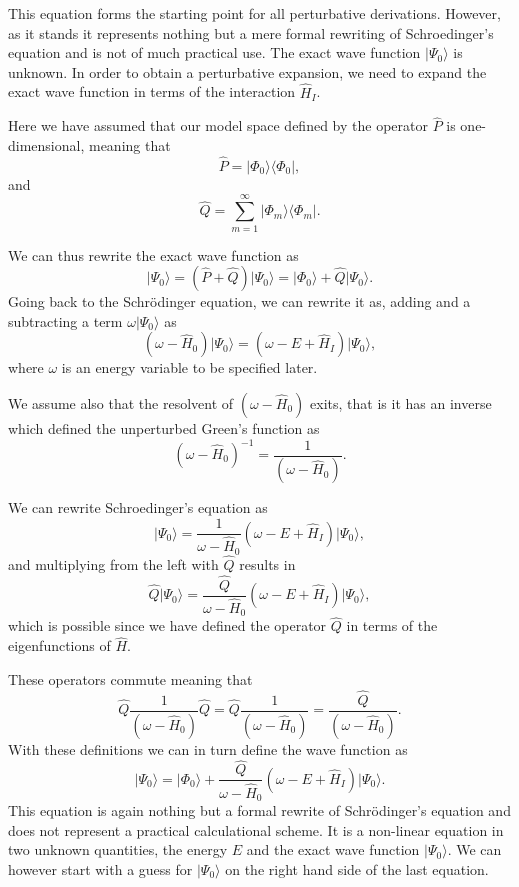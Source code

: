 \documentclass[graybox,sectrefs,envcountresetchap,open=right]{svmonodo}
\begin{document}
This equation forms the starting point for all perturbative derivations. However,
as it stands it represents nothing but a mere formal rewriting of Schroedinger's equation and is not of much practical use. The exact wave function $\vert \Psi_0\rangle$ is unknown. In order to obtain a perturbative expansion, we need to expand the exact wave function in terms of the interaction $\hat{H}_I$. 

Here we have assumed that our model space defined by the operator $\hat{P}$ is one-dimensional, meaning that
\[
\hat{P}= \vert \Phi_0\rangle \langle \Phi_0\vert ,
\]
and
\[
\hat{Q}=\sum_{m=1}^{\infty}\vert \Phi_m\rangle \langle \Phi_m\vert .
\]


We can thus rewrite the exact wave function as
\[
\vert \Psi_0\rangle= (\hat{P}+\hat{Q})\vert \Psi_0\rangle=\vert \Phi_0\rangle+\hat{Q}\vert \Psi_0\rangle.
\]
Going back to the Schr\"odinger equation, we can rewrite it as, adding and a subtracting a term $\omega \vert \Psi_0\rangle$ as
\[
\left(\omega-\hat{H}_0\right)\vert \Psi_0\rangle=\left(\omega-E+\hat{H}_I\right)\vert \Psi_0\rangle,
\]
where $\omega$ is an energy variable to be specified later. 


We assume also that the resolvent of $\left(\omega-\hat{H}_0\right)$ exits, that is
it has an inverse which defined the unperturbed Green's function as
\[
\left(\omega-\hat{H}_0\right)^{-1}=\frac{1}{\left(\omega-\hat{H}_0\right)}.
\]

We can rewrite Schroedinger's equation as
\[
\vert \Psi_0\rangle=\frac{1}{\omega-\hat{H}_0}\left(\omega-E+\hat{H}_I\right)\vert \Psi_0\rangle,
\]
and multiplying from the left with $\hat{Q}$ results in
\[
\hat{Q}\vert \Psi_0\rangle=\frac{\hat{Q}}{\omega-\hat{H}_0}\left(\omega-E+\hat{H}_I\right)\vert \Psi_0\rangle,
\]
which is possible since we have defined the operator $\hat{Q}$ in terms of the eigenfunctions of $\hat{H}$.




These operators commute meaning that
\[
\hat{Q}\frac{1}{\left(\omega-\hat{H}_0\right)}\hat{Q}=\hat{Q}\frac{1}{\left(\omega-\hat{H}_0\right)}=\frac{\hat{Q}}{\left(\omega-\hat{H}_0\right)}.
\]
With these definitions we can in turn define the wave function as 
\[
\vert \Psi_0\rangle=\vert \Phi_0\rangle+\frac{\hat{Q}}{\omega-\hat{H}_0}\left(\omega-E+\hat{H}_I\right)\vert \Psi_0\rangle.
\]
This equation is again nothing but a formal rewrite of Schr\"odinger's equation
and does not represent a practical calculational scheme.  
It is a non-linear equation in two unknown quantities, the energy $E$ and the exact
wave function $\vert \Psi_0\rangle$. We can however start with a guess for $\vert \Psi_0\rangle$ on the right hand side of the last equation.
\end{document}
